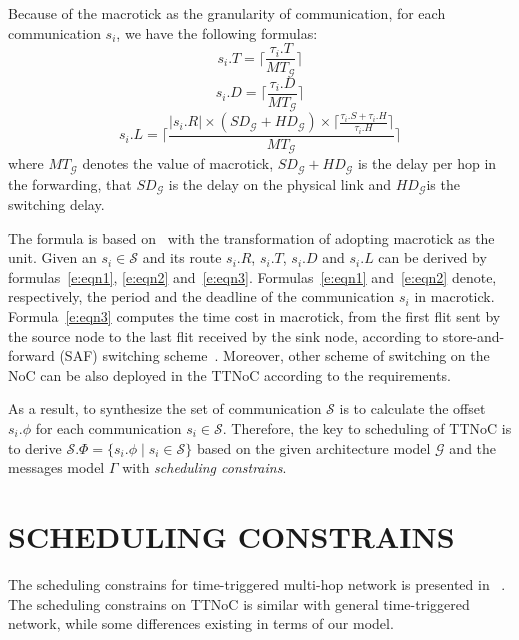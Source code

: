 \documentclass[journal]{IEEEtran}
\newcommand{\calG}{\mathcal{G}}
\newcommand{\calS}{\mathcal{S}}
\newcommand{\SD}{\mathit{SD}_\calG}
\newcommand{\HD}{\mathit{HD}_\calG}
\newcommand{\MT}{\mathit{MT}_\calG}
\begin{document}
Because of the macrotick as the granularity of communication,
for each communication $s_{i}$,
we have the following formulas:
\begin{equation}
\label{e:eqn1}
  s_i.T = \lceil\frac{\tau_{i}.T}{\MT} \rceil
\end{equation}
\begin{equation}
\label{e:eqn2}
  s_i.D = \lceil\frac{\tau_{i}.D}{\MT}\rceil
\end{equation}
\begin{equation}
\label{e:eqn3}
  s_i.L = \lceil\frac{|s_i.R| \times (\SD+\HD) \times
    \lceil\frac{\tau_{i}.S + \tau_{i}.H}{\tau_{i}.H  }\rceil}{\MT}\rceil
\end{equation}
where $\MT$ denotes the value of macrotick,
$\SD+\HD$ is the delay per hop in the forwarding,
that $\SD$ is the delay on the physical link and $\HD$is the switching delay.

The formula is based on~\cite{DBLP:books/daglib/0087651} with the transformation of adopting macrotick as the unit.
Given an $s_{i}\in\calS$ and its route $s_i.R$, $s_i.T$, $s_i.D$ and $s_i.L$ can be derived by formulas~\ref{e:eqn1}, 
\ref{e:eqn2} and~\ref{e:eqn3}. 
Formulas~\ref{e:eqn1} and~\ref{e:eqn2} denote, 
respectively, 
the period and the deadline of the communication $s_i$ in macrotick.
Formula~\ref{e:eqn3} computes the time cost in macrotick,
 from the first flit sent by the source node to the last flit received by the sink node, 
 according to store-and-forward (SAF) switching scheme~\cite{DBLP:books/daglib/0087651}. 
Moreover, other scheme of switching on the NoC can be also deployed in the TTNoC according to the requirements.

As a result, to synthesize the set of communication $\calS$ is to
calculate the offset $s_i.\phi$ for each communication
$s_i\in\calS$. Therefore, the key to scheduling of TTNoC is to derive
$\calS.\Phi = \{s_i.\phi\mid s_i\in\calS\}$ based on the given
architecture model $\calG$ and the messages model $\Gamma$ with
\emph{scheduling constrains}.


\section{SCHEDULING CONSTRAINS\label{s:constrain}}

The scheduling constrains for time-triggered multi-hop network is presented in ~\cite{DBLP:conf/rtss/Steiner10}. 
The scheduling constrains on TTNoC is similar with general time-triggered network, 
while some differences existing in terms of our model.
\end{document}
